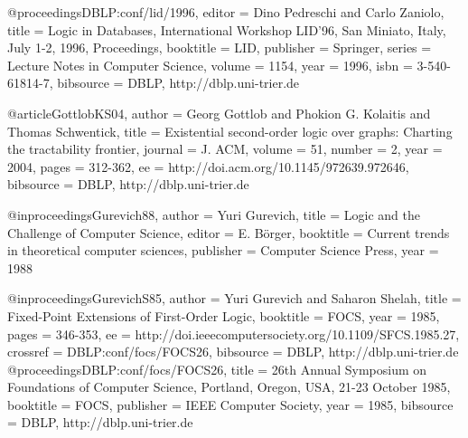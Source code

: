 \documentclass{article}
\begin{document}
@proceedings{DBLP:conf/lid/1996,
  editor    = {Dino Pedreschi and
               Carlo Zaniolo},
  title     = {Logic in Databases, International Workshop LID'96, San Miniato,
               Italy, July 1-2, 1996, Proceedings},
  booktitle = {LID},
  publisher = {Springer},
  series    = {Lecture Notes in Computer Science},
  volume    = {1154},
  year      = {1996},
  isbn      = {3-540-61814-7},
  bibsource = {DBLP, http://dblp.uni-trier.de}
}

@article{GottlobKS04,
  author    = {Georg Gottlob and
               Phokion G. Kolaitis and
               Thomas Schwentick},
  title     = {Existential second-order logic over graphs: Charting the
               tractability frontier},
  journal   = {J. ACM},
  volume    = {51},
  number    = {2},
  year      = {2004},
  pages     = {312-362},
  ee        = {http://doi.acm.org/10.1145/972639.972646},
  bibsource = {DBLP, http://dblp.uni-trier.de}
}

@inproceedings{Gurevich88,
    author = {Yuri Gurevich},
    title = {Logic and the Challenge of Computer Science},
    editor = {E. B\"orger},
    booktitle = {Current trends in theoretical computer sciences},
    publisher = {Computer Science Press},
    year = {1988}
}

@inproceedings{GurevichS85,
  author    = {Yuri Gurevich and
               Saharon Shelah},
  title     = {Fixed-Point Extensions of First-Order Logic},
  booktitle = {FOCS},
  year      = {1985},
  pages     = {346-353},
  ee        = {http://doi.ieeecomputersociety.org/10.1109/SFCS.1985.27},
  crossref  = {DBLP:conf/focs/FOCS26},
  bibsource = {DBLP, http://dblp.uni-trier.de}
}
@proceedings{DBLP:conf/focs/FOCS26,
  title     = {26th Annual Symposium on Foundations of Computer Science,
               Portland, Oregon, USA, 21-23 October 1985},
  booktitle = {FOCS},
  publisher = {IEEE Computer Society},
  year      = {1985},
  bibsource = {DBLP, http://dblp.uni-trier.de}
}
\end{document}
